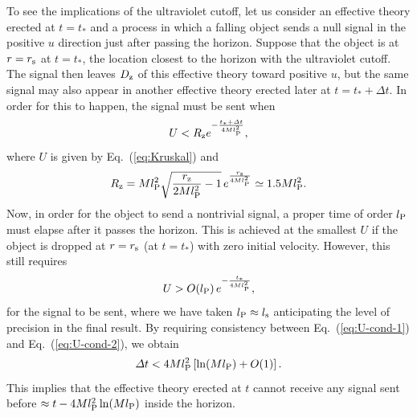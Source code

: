 \documentclass[12pt]{article}
\begin{document}
To see the implications of the ultraviolet cutoff, let us consider 
an effective theory erected at $t = t_*$ and a process in which a 
falling object sends a null signal in the positive $u$ direction 
just after passing the horizon.  Suppose that the object is at 
$r = r_{\rm s}$ at $t = t_*$, the location closest to the horizon 
with the ultraviolet cutoff.  The signal then leaves $D_{\rm z}$ 
of this effective theory toward positive $u$, but the same signal 
may also appear in another effective theory erected later at 
$t = t_* + \varDelta t$.  In order for this to happen, the signal 
must be sent when
%
\begin{equation}
  U < R_{\rm z} e^{-\frac{t_*+\varDelta t}{4Ml_{\rm P}^2}},
\label{eq:U-cond-1}
\end{equation}
%
where $U$ is given by Eq.~(\ref{eq:Kruskal}) and
%
\begin{equation}
  R_{\rm z} = Ml_{\rm P}^2 \sqrt{\frac{r_{\rm z}}{2Ml_{\rm P}^2}-1}\, 
    e^{\frac{r_{\rm z}}{4Ml_{\rm P}^2}} 
  \simeq 1.5 Ml_{\rm P}^2.
\label{eq:R_z}
\end{equation}
%
Now, in order for the object to send a nontrivial signal, a proper 
time of order $l_{\rm P}$ must elapse after it passes the horizon. 
This is achieved at the smallest $U$ if the object is dropped at 
$r = r_{\rm s}$ (at $t = t_*$) with zero initial velocity.  However, 
this still requires
%
\begin{equation}
  U > O(l_{\rm P})\, e^{-\frac{t_*}{4Ml_{\rm P}^2}},
\label{eq:U-cond-2}
\end{equation}
%
for the signal to be sent, where we have taken $l_{\rm P} \approx 
l_{\rm s}$ anticipating the level of precision in the final result. 
By requiring consistency between Eq.~(\ref{eq:U-cond-1}) and 
Eq.~(\ref{eq:U-cond-2}), we obtain
%
\begin{equation}
  \varDelta t < 4Ml_{\rm P}^2 \left[ \ln(Ml_{\rm P}) + O(1) \right].
\label{eq:del-t_t0}
\end{equation}
%
This implies that the effective theory erected at $t$ cannot receive 
any signal sent before $\approx t - 4Ml_{\rm P}^2 \ln(Ml_{\rm P})$ 
inside the horizon.
\end{document}
